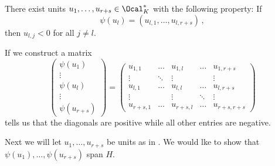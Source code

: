 \begin{lem}\label{thm:3.30}
	There exist units \( u_1, \dotsc, u_{r+s} \in \Ocal_K^* \) with the following property: If
	\[ \psi(u_l) = \left( u_{l,1}, \dotsc, u_{l,{r+s}} \right) \,, \]
	then \( u_{l,j} < 0 \) for all \( j \neq l \).
\end{lem}

\begin{rem*}
	If we construct a matrix
	\[ \begin{pmatrix}
		\psi(u_1) \\ \vdots \\ \psi(u_l) \\ \vdots \\ \psi(u_{r+s})
	\end{pmatrix} = \begin{pmatrix}
	u_{1,1} & \dots & u_{1,l} & \dots & u_{1, r+s}\\
	\vdots & \ddots & \vdots & & \vdots\\
	u_{l,1} & \dots & u_{l,l} & \dots & u_{l, r+s}\\
	\vdots & & \vdots & \ddots & \vdots\\
	u_{r+s, 1} & \dots & u_{r+s, l} & \dots & u_{r+s, r+s}
	\end{pmatrix} \]
	 tells us that the diagonals are positive while all other entries are negative.
\end{rem*}

Next we will let \( u_1, \dotsc, u_{r+s} \) be units as in .
We would lke to show that \( \psi(u_1), \dotsc, \psi(u_{r+s}) \) span \( H \).